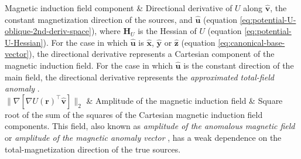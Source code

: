 {\begin{center}
\begin{tabular}
			Magnetic induction field component &
			Directional derivative of $U$ along $\hat{\mathbf{v}}$, the constant magnetization direction of the sources, 
			and $\hat{\mathbf{u}}$ (equation \ref{eq:potential-U-oblique-2nd-deriv-space}), where $\mathbf{H}_{U}$ is the 
			Hessian of $U$ (equation \ref{eq:potential-U-Hessian}). For the case in which 
			$\hat{\mathbf{u}}$ is $\hat{\mathbf{x}}$, $\hat{\mathbf{y}}$ or $\hat{\mathbf{z}}$ (equation \ref{eq:canonical-base-vector}),
			the directional derivative represents a Cartesian component of the magnetic induction field. 
			For the case in which $\hat{\mathbf{u}}$ is the constant direction of the main field, the directional derivative 
			represents the \textit{approximated total-field anomaly} \cite[e.g., ][ p. 179]{blakely1996}. \\
			$\| \nabla \left[\nabla U(\mathbf{r})^{\top} \hat{\mathbf{v}}\right] \|_{2}$ &
			Amplitude of the magnetic induction field &
			Square root of the sum of the squares of the Cartesian magnetic induction field components. This field, also known as 
			\textit{amplitude of the anomalous magnetic field} \citep{li_etal2010} or 
			\textit{amplitude of the magnetic anomaly vector} \citep{hidalgo_gato_etal2021, melo_etal2021}, has a weak dependence on the total-magnetization direction of the
			true sources. \\
		\end{tabular}
	\end{center}
	\label{tbl:Table2}
}